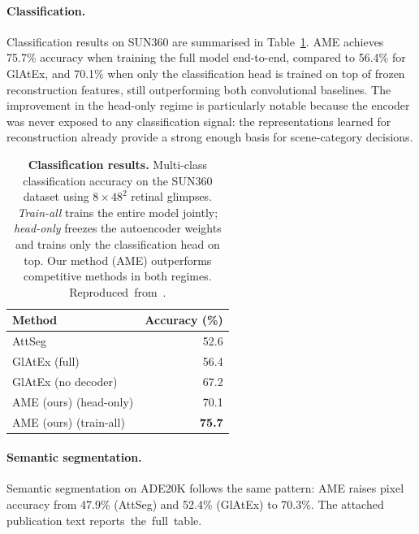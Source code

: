 \paragraph{Classification.} Classification results on SUN360 are summarised in Table~\ref{tab:ame-classification}. AME achieves 75.7\% accuracy when training the full model end-to-end, compared to 56.4\% for GlAtEx, and 70.1\% when only the classification head is trained on top of frozen reconstruction features, still outperforming both convolutional baselines. The improvement in the head-only regime is particularly notable because the encoder was never exposed to any classification signal: the representations learned for reconstruction already provide a strong enough basis for scene-category decisions.

\begin{table}[t]
    \caption[Classification accuracy on SUN360]{\textbf{Classification results.} Multi-class classification accuracy on the SUN360 dataset using $8\times48^2$ retinal glimpses. \textit{Train-all} trains the entire model jointly; \textit{head-only} freezes the autoencoder weights and trains only the classification head on top. Our method (AME) outperforms competitive methods in both regimes. Reproduced~from~.}
    \label{tab:ame-classification}
    \centering
    \begin{footnotesize}
    \begin{sc}
    \begin{tabular}{lr}
        \toprule
        Method & Accuracy (\%) \\
        \midrule
        AttSeg & 52.6 \\
        GlAtEx (full) & 56.4 \\
        GlAtEx (no decoder) & 67.2 \\
        AME (ours) (head-only) & 70.1 \\
        AME (ours) (train-all) & \textbf{75.7} \\
        \bottomrule
    \end{tabular}
    \end{sc}
    \end{footnotesize}
\end{table}

\paragraph{Semantic segmentation.} Semantic segmentation on ADE20K follows the same pattern: AME raises pixel accuracy from 47.9\% (AttSeg) and 52.4\% (GlAtEx) to 70.3\%. The attached publication text reports~the~full~table.

